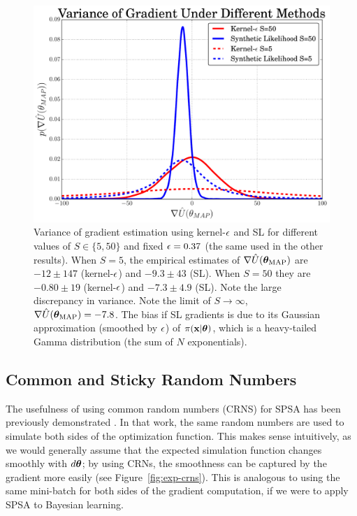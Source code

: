 \documentclass[]{article}
\begin{document}
\begin{figure}[t]
\vskip 0.2in
\begin{center}
\includegraphics[width=0.95\columnwidth]{./images/exp_varg_figure.pdf}
\caption{\small{Variance of gradient estimation using kernel-$\epsilon$ and SL for different values of $S\in\{5,50\}$ and fixed $\epsilon = 0.37$ (the same used in the other results).  
%
When $S=5$, the empirical estimates of  $\nabla \hat{U}({\bm \theta}_{\text{MAP}})$ are $-12 \pm 147$ (kernel-$\epsilon$) and $-9.3 \pm 43$ (SL).  When $S=50$ they are $-0.80 \pm 19$ (kernel-$\epsilon$) and $-7.3 \pm 4.9$ (SL).  Note the large discrepancy in variance.  Note the limit of $S \rightarrow \infty$,   $\nabla \hat{U}({\bm \theta}_{\text{MAP}}) = -7.8$.  The bias if SL gradients is due to its Gaussian approximation (smoothed by $\epsilon$) of $\pi({\bf x}|{\bm \theta})$, which is a heavy-tailed Gamma distribution (the sum of $N$ exponentials).}}
\label{fig:exp-varg}
\end{center}
\vskip -0.2in
\end{figure}

\subsection{Common and Sticky Random Numbers}
The usefulness of using common random numbers (CRNS) for SPSA has been previously demonstrated \cite{kleinman1999simulation}.  In that work, the same random numbers are used to simulate both sides of the optimization function.  This makes sense intuitively, as we would generally assume that the expected simulation function changes smoothly with $d {\bm \theta}$;  by using CRNs, the smoothness can be captured by the gradient more easily (see Figure~\ref{fig:exp-crns}).  This is analogous to using the same mini-batch for both sides of the gradient computation, if we were to apply SPSA to Bayesian learning.  
\end{document}
